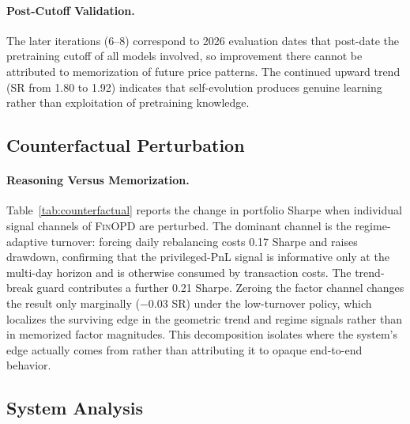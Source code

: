 \paragraph{Post-Cutoff Validation.} The later iterations (6--8) correspond to 2026 evaluation dates that post-date the pretraining cutoff of all models involved, so improvement there cannot be attributed to memorization of future price patterns. The continued upward trend (SR from 1.80 to 1.92) indicates that self-evolution produces genuine learning rather than exploitation of pretraining knowledge.

\subsection{Counterfactual Perturbation}



\paragraph{Reasoning Versus Memorization.} Table~\ref{tab:counterfactual} reports the change in portfolio Sharpe when individual signal channels of \textsc{FinOPD} are perturbed. The dominant channel is the regime-adaptive turnover: forcing daily rebalancing costs 0.17 Sharpe and raises drawdown, confirming that the privileged-PnL signal is informative only at the multi-day horizon and is otherwise consumed by transaction costs. The trend-break guard contributes a further 0.21 Sharpe. Zeroing the factor channel changes the result only marginally ($-$0.03 SR) under the low-turnover policy, which localizes the surviving edge in the geometric trend and regime signals rather than in memorized factor magnitudes. This decomposition isolates where the system's edge actually comes from rather than attributing it to opaque end-to-end behavior.

\subsection{System Analysis}


